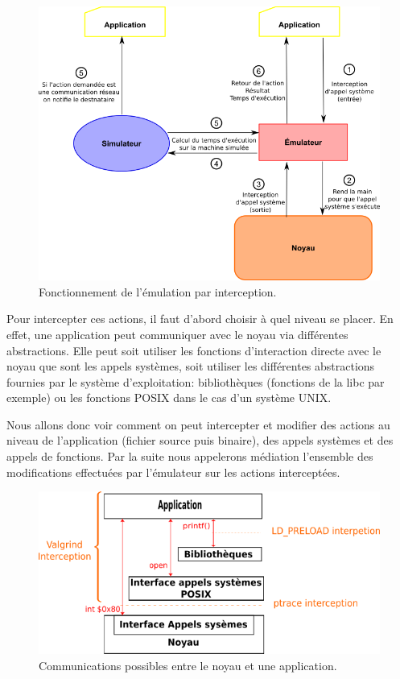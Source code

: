  \begin{figure}
   \centering \includegraphics[scale=0.5]{Pictures/png/Emulation_fonctionnement}
   \caption{Fonctionnement de l'émulation par interception.}
   \label{INTERCEPTION}
 \end{figure}
 
Pour intercepter ces actions, il faut d'abord choisir à quel niveau se placer.
En effet, une application peut communiquer avec le noyau via différentes
abstractions. Elle peut soit utiliser les fonctions d'interaction directe avec
le noyau que sont les appels systèmes, soit utiliser les différentes
abstractions fournies par le système d'exploitation: bibliothèques (fonctions de
la libc par exemple) ou les fonctions POSIX dans le cas d'un système UNIX.

Nous allons donc voir comment on peut intercepter et modifier des actions au
niveau de l'application (fichier source puis binaire), des appels systèmes et
des appels de fonctions. Par la suite nous appelerons médiation l'ensemble des
modifications effectuées par l'émulateur sur les actions interceptées.

\begin{figure}[H]
 \centering
 \includegraphics[scale=0.75]{Pictures/png/Communication_application_noyau_v3.png}
 \caption{Communications possibles entre le noyau et une application.}
 \label{AS_Communication}
\end{figure}
